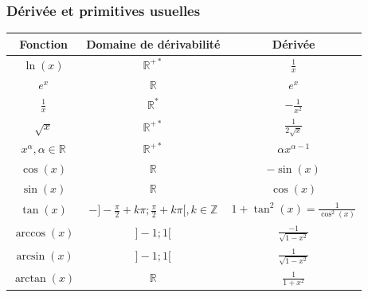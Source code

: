 \documentclass[8pt]{article}
\begin{document}
                \subsubsection{Dérivée et primitives usuelles}
                    \begin{center}
                        \renewcommand{\arraystretch}{1.5}
                        \begin{tabular}{|c|c|c|}
                            \hline
                            \textbf{Fonction} & \textbf{Domaine de dérivabilité} & \textbf{Dérivée}\\
                            \hline 
                            \hline
                            $\ln(x)$ & $ \mathbb{R}^{+*} $ & $ \frac{1}{x}$\\
                            \hline 
                            $e^x$ & $ \mathbb{R}$ & $ e^{x}$\\ 
                            \hline
                            $\frac{1}{x}$ & $ \mathbb{R}^*$ & $ - \frac{1}{x^2} $\\ 
                            \hline
                            $ \sqrt{x}$ & $ \mathbb{R}^{+*}$ & $ \frac{1}{2\sqrt{x}}$\\ 
                            \hline
                            $ x^\alpha, \alpha \in \mathbb{R}$ & $ \mathbb{R}^{+*}$ & $ \alpha  x^{\alpha-1} $\\ 
                            \hline
                            $ \cos(x)$ & $ \mathbb{R}$ & $ -\sin(x)$\\ 
                            \hline
                            $ \sin(x)$ & $ \mathbb{R}$ & $ \cos(x) $\\ 
                            \hline
                            $ \tan(x)$ & $ -]-\frac{\pi}{2} +k\pi ; \frac{\pi}{2} + k\pi[, k \in \mathbb{Z}$ & $ 1+\tan^2(x) = \frac{1}{\cos^2(x)}$\\ 
                            \hline
                            $ \arccos(x)$ & $ ]-1;1[$ & $ \frac{-1}{\sqrt{1-x^2}}$\\ 
                            \hline
                            $ \arcsin(x)$ & $ ]-1;1[$ & $ \frac{1}{\sqrt{1-x^2}}$\\ 
                            \hline
                            $ \arctan(x)$ & $ \mathbb{R}$ & $ \frac{1}{1+x^2}$\\

\end{tabular}
\end{center}
\end{document}

